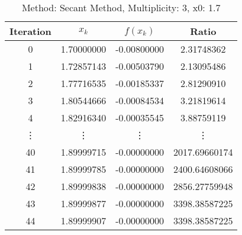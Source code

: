 \begin{table}
\centering
\caption{Method: Secant Method, Multiplicity: 3, x0: 1.7}
\label{tab:table_Secant_Method_3_1_7}
\begin{tabular}{c c c c}
\toprule
Iteration &      $x_k$ &    $f(x_k)$ &         Ratio \\
\midrule
        0 & 1.70000000 & -0.00800000 &    2.31748362 \\
        1 & 1.72857143 & -0.00503790 &    2.13095486 \\
        2 & 1.77716535 & -0.00185337 &    2.81290910 \\
        3 & 1.80544666 & -0.00084534 &    3.21819614 \\
        4 & 1.82916340 & -0.00035545 &    3.88759119 \\
   \vdots &     \vdots &      \vdots &        \vdots \\
       40 & 1.89999715 & -0.00000000 & 2017.69660174 \\
       41 & 1.89999785 & -0.00000000 & 2400.64608066 \\
       42 & 1.89999838 & -0.00000000 & 2856.27759948 \\
       43 & 1.89999877 & -0.00000000 & 3398.38587225 \\
       44 & 1.89999907 & -0.00000000 & 3398.38587225 \\
\bottomrule
\end{tabular}
\end{table}
